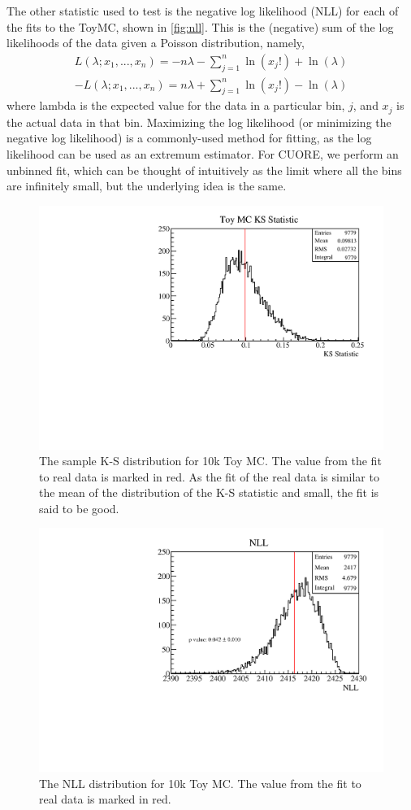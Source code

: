 The other statistic used to test is the negative log likelihood (NLL) for each of the fits to the ToyMC, shown in \autoref{fig:nll}. This is the (negative) sum of the log likelihoods of the data given a Poisson distribution, namely,
\begin{eqnarray}
L(\lambda; x_1,...,x_n) = -n\lambda - \sum_{j=1}^{n}\ln(x_j!) +\ln(\lambda) \\
-L(\lambda; x_1,...,x_n) = n\lambda + \sum_{j=1}^{n}\ln(x_j!) -\ln(\lambda)
\end{eqnarray}
where lambda is the expected value for the data in a particular bin, $j$, and $x_j$ is the actual data in that bin.
Maximizing the log likelihood (or minimizing the negative log likelihood) is a commonly-used method for fitting, as the log likelihood can be used as an extremum estimator. 
For CUORE, we perform an unbinned fit, which can be thought of intuitively as the limit where all the bins are infinitely small, but the underlying idea is the same.

\begin{figure}
\centering
\includegraphics[width=0.7\linewidth]{Figures/Appendix_Figures/KSStat_NoPoisson.pdf}
\caption[The sample K-S distribution for 10k Toy MC]
{The sample K-S distribution for 10k Toy MC. The value from the fit to real data is marked in red.
As the fit of the real data is similar to the mean of the distribution of the K-S statistic and small, the fit is said to be good.}
\label{fig:ksstat}
\end{figure}

\begin{figure}
\centering
\includegraphics[width=0.7\linewidth]{Figures/Appendix_Figures/NLL_Pvalue_NoPoisson.pdf}
\caption[The NLL distribution for 10k Toy MC]
{The NLL distribution for 10k Toy MC.
The value from the fit to real data is marked in red.}
\label{fig:nll}
\end{figure}


